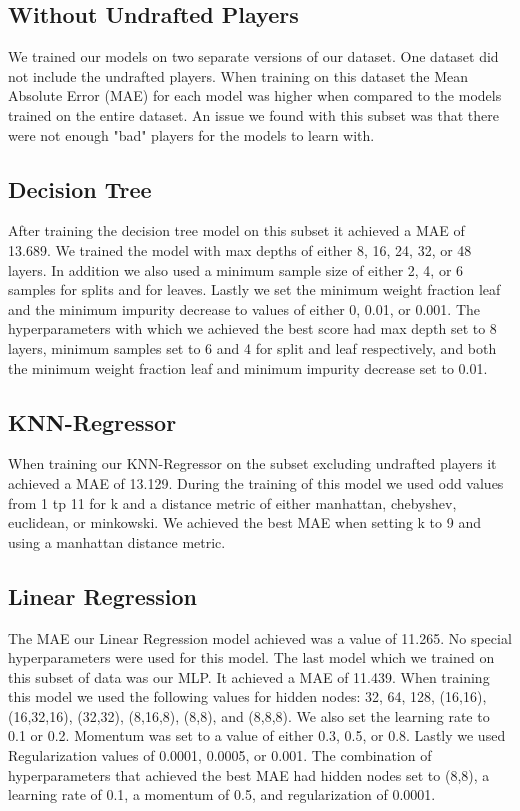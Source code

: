 \documentclass{article}
\begin{document}
\subsection{Without Undrafted Players}
We trained our models on two separate versions of our dataset. One dataset did not include
the undrafted players. When training on this dataset the Mean Absolute Error (MAE) for each model was higher 
when compared to the models trained on the entire dataset. An issue we found with this subset was that there
were not enough "bad" players for the models to learn with.
\subsection{Decision Tree}
After training the decision tree model on this subset it achieved a MAE of 13.689. 
We trained the model with max depths of either 8, 16, 24, 32, or 48 layers. In addition we also used a minimum sample size of either 2, 4, or 6 samples 
for splits and for leaves. Lastly we set the minimum weight fraction leaf and the minimum impurity decrease to values of either 0, 0.01, or 0.001.
The hyperparameters with which we achieved the best score had max depth set to 8 layers, minimum samples set to 6 and 4 for split and leaf respectively, and both the minimum weight fraction leaf and minimum impurity decrease set to 0.01.
\subsection{KNN-Regressor}
When training our KNN-Regressor on the subset excluding undrafted players it achieved a MAE of 13.129.
During the training of this model we used odd values from 1 tp 11 for k and a distance metric of either manhattan, chebyshev, euclidean, or minkowski.
We achieved the best MAE when setting k to 9 and using a manhattan distance metric.
\subsection{Linear Regression}
The MAE our Linear Regression model achieved was a value of 11.265.
No special hyperparameters were used for this model.
The last model which we trained on this subset of data was our MLP. It achieved a MAE of 11.439.
When training this model we used the following values for hidden nodes: 32, 64, 128, (16,16), (16,32,16), (32,32), (8,16,8), (8,8), and (8,8,8).
We also set the learning rate to 0.1 or 0.2. Momentum was set to a value of either 0.3, 0.5, or 0.8. 
Lastly we used Regularization values of 0.0001, 0.0005, or 0.001.
The combination of hyperparameters that achieved the best MAE had hidden nodes set to (8,8), a learning rate of 0.1,
a momentum of 0.5, and regularization of 0.0001.
\end{document}
